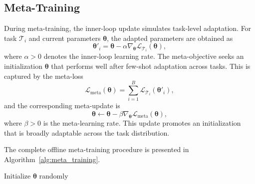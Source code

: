 \documentclass[journal,10pt]{IEEEtran}
\begin{document}
\subsection{Meta-Training}
During meta-training, the inner-loop update simulates task-level adaptation. For task $\mathcal{T}_i$ and current parameters $\boldsymbol{\theta}$, the adapted parameters are obtained as
\begin{equation}
\boldsymbol{\theta}'_i
=
\boldsymbol{\theta}
-
\alpha \nabla_{\boldsymbol{\theta}}
\mathcal{L}_{\mathcal{T}_i}(\boldsymbol{\theta}),
\label{eq:inner_loop}
\end{equation}
where $\alpha>0$ denotes the inner-loop learning rate. 
The meta-objective seeks an initialization $\boldsymbol{\theta}$ that performs well after few-shot adaptation across tasks. This is captured by the meta-loss
\begin{equation}
\mathcal{L}_{\mathrm{meta}}(\boldsymbol{\theta})
=
\sum_{i=1}^{B}
\mathcal{L}_{\mathcal{T}_i}(\boldsymbol{\theta}'_i),
\label{eq:meta_loss}
\end{equation}
and the corresponding meta-update is
\begin{equation}
\boldsymbol{\theta}
\leftarrow
\boldsymbol{\theta}
-
\beta \nabla_{\boldsymbol{\theta}}
\mathcal{L}_{\mathrm{meta}}(\boldsymbol{\theta}),
\label{eq:meta_update}
\end{equation}
where $\beta>0$ is the meta-learning rate. This update promotes an initialization that is broadly adaptable across the task distribution.

The complete offline meta-training procedure is presented in Algorithm~\ref{alg:meta_training}.
\begin{algorithm}[h]
\caption{Meta-Training for Pinching-Antenna Control (MAML-Style)}
\label{alg:meta_training}
\SetAlgoLined
{}
Initialize $\boldsymbol{\theta}$ randomly\;
\end{algorithm}
\end{document}
